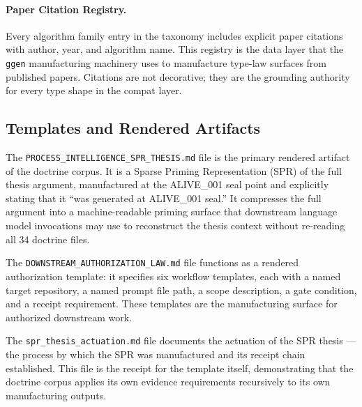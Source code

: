 \paragraph{Paper Citation Registry.} Every algorithm family entry in the taxonomy includes
explicit paper citations with author, year, and algorithm name. This registry is the data
layer that the \texttt{ggen} manufacturing machinery uses to manufacture type-law surfaces
from published papers. Citations are not decorative; they are the grounding authority for
every type shape in the compat layer.

\subsection{Templates and Rendered Artifacts}
\label{sec:doctrine-implementation-templates}

The \texttt{PROCESS\_INTELLIGENCE\_SPR\_THESIS.md} file is the primary rendered artifact of
the doctrine corpus. It is a Sparse Priming Representation (SPR) of the full thesis argument,
manufactured at the ALIVE\_001 seal point and explicitly stating that it ``was generated at
ALIVE\_001 seal.'' It compresses the full argument into a machine-readable priming surface
that downstream language model invocations may use to reconstruct the thesis context without
re-reading all 34 doctrine files.

The \texttt{DOWNSTREAM\_AUTHORIZATION\_LAW.md} file functions as a rendered authorization
template: it specifies six workflow templates, each with a named target repository, a named
prompt file path, a scope description, a gate condition, and a receipt requirement. These
templates are the manufacturing surface for authorized downstream work.

The \texttt{spr\_thesis\_actuation.md} file documents the actuation of the SPR thesis ---
the process by which the SPR was manufactured and its receipt chain established. This file
is the receipt for the template itself, demonstrating that the doctrine corpus applies its own
evidence requirements recursively to its own manufacturing outputs.
